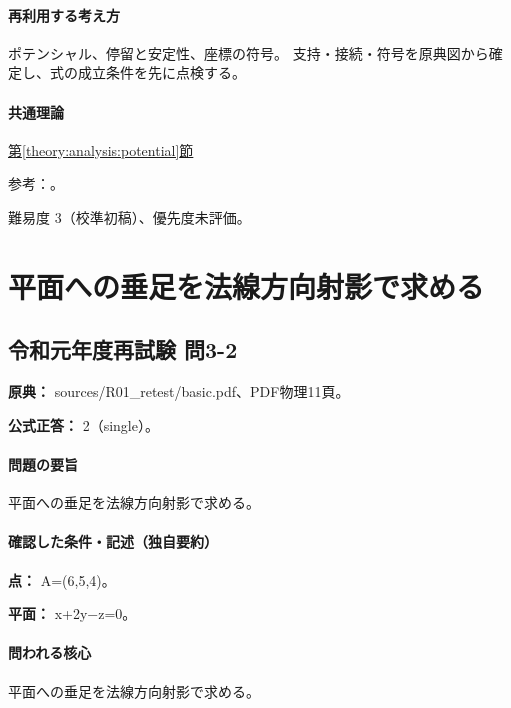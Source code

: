\paragraph{再利用する考え方} ポテンシャル、停留と安定性、座標の符号。 支持・接続・符号を原典図から確定し、式の成立条件を先に点検する。

\paragraph{共通理論} \hyperref[theory:analysis:potential]{第\ref*{theory:analysis:potential}節}

\par 参考：\cite{analysis57_shm}。

\par 難易度 3（校準初稿）、優先度未評価。

\section{平面への垂足を法線方向射影で求める}

\subsection{令和元年度再試験 問3-2}
\label{q:r01-ret-basic-3-2}

\noindent\textbf{原典：} sources/R01\_retest/basic.pdf、PDF物理11頁。

\textbf{公式正答：} 2（single）。

\paragraph{問題の要旨} 平面への垂足を法線方向射影で求める。

\paragraph{確認した条件・記述（独自要約）}\mbox{}\par

\noindent\textbf{点：} A=\allowbreak{}(6,5,4)。\par

\noindent\textbf{平面：} x+2y−z=\allowbreak{}0。\par

\paragraph{問われる核心} 平面への垂足を法線方向射影で求める。

